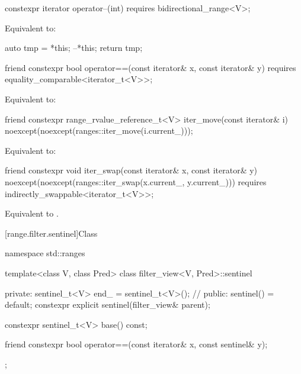 %
\begin{itemdecl}
constexpr iterator operator--(int) requires bidirectional_range<V>;
\end{itemdecl}

\begin{itemdescr}
\pnum
\effects Equivalent to:
\begin{codeblock}
auto tmp = *this;
--*this;
return tmp;
\end{codeblock}
\end{itemdescr}

%
\begin{itemdecl}
friend constexpr bool operator==(const iterator& x, const iterator& y)
  requires equality_comparable<iterator_t<V>>;
\end{itemdecl}

\begin{itemdescr}
\pnum
\effects Equivalent to: 
\end{itemdescr}

%
\begin{itemdecl}
friend constexpr range_rvalue_reference_t<V> iter_move(const iterator& i)
  noexcept(noexcept(ranges::iter_move(i.current_)));
\end{itemdecl}

\begin{itemdescr}
\pnum
\effects Equivalent to: 
\end{itemdescr}

%
\begin{itemdecl}
friend constexpr void iter_swap(const iterator& x, const iterator& y)
  noexcept(noexcept(ranges::iter_swap(x.current_, y.current_)))
  requires indirectly_swappable<iterator_t<V>>;
\end{itemdecl}

\begin{itemdescr}
\pnum
\effects Equivalent to .
\end{itemdescr}

[range.filter.sentinel]{Class }

%
\begin{codeblock}
namespace std::ranges {
  template<class V, class Pred>
  class filter_view<V, Pred>::sentinel {
  private:
    sentinel_t<V> end_ = sentinel_t<V>();       // \expos
  public:
    sentinel() = default;
    constexpr explicit sentinel(filter_view& parent);

    constexpr sentinel_t<V> base() const;

    friend constexpr bool operator==(const iterator& x, const sentinel& y);
  };
}
\end{codeblock}

